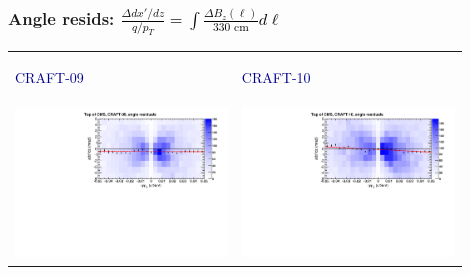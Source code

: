 \documentclass[compress]{beamer}
\begin{document}
\begin{frame}
\frametitle{\large Angle resids: \textcolor{black}{$\displaystyle \frac{\Delta dx'/dz}{q/p_T} = \int \frac{\Delta B_z(\ell)}{\mbox{330~cm}} d\ell$}}

\begin{tabular}{p{0.45\linewidth} p{0.45\linewidth}}
\begin{center} \large \textcolor{darkblue}{CRAFT-09} \end{center} & \begin{center} \large \textcolor{darkblue}{CRAFT-10} \end{center} \\
\includegraphics[width=\linewidth]{bfield_dxdz_craft09_top.pdf} & \includegraphics[width=\linewidth]{bfield_dxdz_craft10_top.pdf} \\

\end{tabular}
\end{frame}
\end{document}
